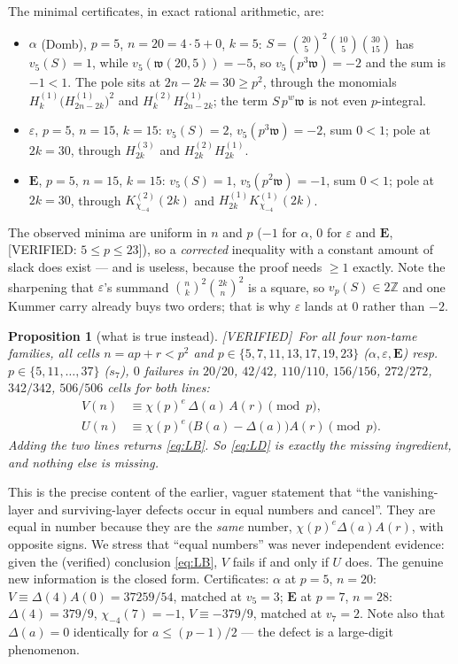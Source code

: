 \documentclass[11pt,reqno]{amsart}
\theoremstyle{plain}
\newtheorem{proposition}[theorem]{Proposition}
\theoremstyle{definition}
\theoremstyle{remark}
\newcommand{\Z}{\mathbb{Z}}
\newcommand{\vp}{v_p}
\newcommand{\bin}[2]{\binom{#1}{#2}}
\newcommand{\HH}[2]{H^{(#1)}_{#2}}
\newcommand{\KK}[3]{K^{(#1)}_{#2}\!\left(#3\right)}
\newcommand{\Verified}{\textup{\textsf{[VERIFIED]}}}
\newcommand{\VerifiedR}[1]{\textup{\textsf{[VERIFIED: #1]}}}
\numberwithin{equation}{section}
\begin{document}
The minimal certificates, in exact rational arithmetic, are:
\begin{itemize}[leftmargin=1.6em]
\item $\alpha$ (Domb), $p=5$, $n=20=4\cdot5+0$, $k=5$:
  $S=\bin{20}5^2\bin{10}5\bin{30}{15}$ has $v_5(S)=1$, while
  $v_5(\mathfrak w(20,5))=-5$, so $v_5(p^3\mathfrak w)=-2$ and the sum is $-1<1$. The pole
  sits at $2n-2k=30\ge p^2$, through the monomials $\HH1k\bigl(\HH1{2n-2k}\bigr)^2$ and
  $\HH2k\HH1{2n-2k}$; the term $S\,p^{w}\mathfrak w$ is not even $p$-integral.
\item $\varepsilon$, $p=5$, $n=15$, $k=15$: $v_5(S)=2$, $v_5(p^3\mathfrak w)=-2$, sum $0<1$;
  pole at $2k=30$, through $\HH3{2k}$ and $\HH2{2k}\HH1{2k}$.
\item $\mathbf E$, $p=5$, $n=15$, $k=15$: $v_5(S)=1$, $v_5(p^2\mathfrak w)=-1$, sum $0<1$;
  pole at $2k=30$, through $\KK2{\chi_{-4}}{2k}$ and $\HH1{2k}\KK1{\chi_{-4}}{2k}$.
\end{itemize}
The observed minima are uniform in $n$ and $p$ ($-1$ for $\alpha$, $0$ for $\varepsilon$
and $\mathbf E$, \VerifiedR{$5\le p\le23$}), so a \emph{corrected} inequality with a
constant amount of slack does exist --- and is useless, because the proof needs
$\ge1$ exactly. Note the sharpening that $\varepsilon$'s summand $\bin nk^2\bin{2k}n^2$ is a
square, so $\vp(S)\in2\Z$ and one Kummer carry already buys two orders; that is why
$\varepsilon$ lands at $0$ rather than $-2$.

\begin{proposition}[what is true instead]\label{prop:LD}
\Verified\ For all four non-tame families, all cells $n=ap+r<p^2$ and
$p\in\{5,7,11,13,17,19,23\}$ ($\alpha,\varepsilon,\mathbf E$) resp.\
$p\in\{5,11,\dots,37\}$ ($s_7$), $0$ failures in $20/20$, $42/42$, $110/110$, $156/156$,
$272/272$, $342/342$, $506/506$ cells for \emph{both} lines:
\begin{align}
  V(n)&\equiv\chi(p)^{e}\,\Delta(a)\,A(r) \pmod p, \tag{LD}\label{eq:LD}\\
  U(n)&\equiv\chi(p)^{e}\,\bigl(B(a)-\Delta(a)\bigr)A(r) \pmod p. \tag{LD$'$}
\end{align}
Adding the two lines returns \eqref{eq:LB}. So \eqref{eq:LD} is exactly the missing
ingredient, and nothing else is missing.
\end{proposition}

This is the precise content of the earlier, vaguer statement that ``the vanishing-layer and
surviving-layer defects occur in equal numbers and cancel''. They are equal in number
because they are the \emph{same} number, $\chi(p)^{e}\Delta(a)A(r)$, with opposite signs.
We stress that ``equal numbers'' was never independent evidence: given the (verified)
conclusion \eqref{eq:LB}, $V$ fails if and only if $U$ does. The genuine new information is
the closed form. Certificates: $\alpha$ at $p=5$, $n=20$: $V\equiv\Delta(4)A(0)=37259/54$,
matched at $v_5=3$; $\mathbf E$ at $p=7$, $n=28$: $\Delta(4)=379/9$, $\chi_{-4}(7)=-1$,
$V\equiv-379/9$, matched at $v_7=2$. Note also that $\Delta(a)=0$ identically for
$a\le(p-1)/2$ --- the defect is a large-digit phenomenon.
\end{document}
